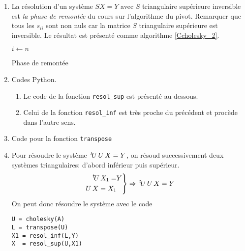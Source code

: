 \begin{enumerate}
 \item La résolution d'un système $SX =Y$ avec $S$ triangulaire supérieure inversible est \emph{la phase de remontée} du cours sur l'algorithme du pivot. Remarquer que tous les $s_{i i}$ sont non nuls car la matrice $S$ triangulaire supérieure est inversible. Le résultat est présenté comme algorithme \ref{Ccholesky_2}.
 \begin{algorithm}
 $i \leftarrow n$\;
 \caption{Phase de remontée}
 \label{Ccholesky_2}
\end{algorithm}
  
  \item Codes Python.
\begin{enumerate}
\item Le code de la fonction \texttt{resol\_sup} est présenté au dessous.


\item Celui de la fonction \texttt{resol\_inf} est très proche du précédent et procède dans l'autre sens.

\end{enumerate}

 \item Code pour la fonction \texttt{transpose}


 \item Pour résoudre le système $\,\mathstrut^t\! U\, U\, X = Y$, on résoud successivement deux systèmes triangulaires: d'abord inférieur puis supérieur.
\begin{displaymath}
\left. 
\begin{aligned}
 \,\mathstrut^t\! U\, X_1 =& Y \\ U\, X = X_1
\end{aligned}
\right\rbrace 
\Rightarrow 
\,\mathstrut^t\! U\, U\, X = Y
\end{displaymath}
On peut donc résoudre le système avec le code
\begin{verbatim}
U = cholesky(A)
L = transpose(U)
X1 = resol_inf(L,Y)
X  = resol_sup(U,X1)
\end{verbatim} 
\end{enumerate}

